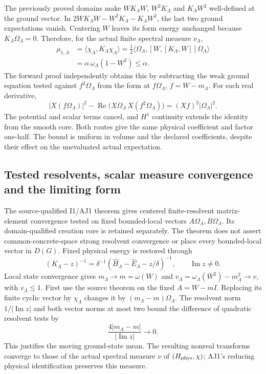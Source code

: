 The previously proved domains make $WK_\Lambda W$, $W^2K_\Lambda$ and $K_\Lambda W^2$ well-defined at the ground vector. In $2WK_\Lambda W-W^2K_\Lambda-K_\Lambda W^2$, the last two ground expectations vanish. Centering $W$ leaves its form energy unchanged because $K_\Lambda\Omega_\Lambda=0$. Therefore, for the actual finite spectral measure $\nu_\Lambda$,
\begin{align}
 \mu_{1,\Lambda}
 &=\langle\chi_\Lambda,K_\Lambda\chi_\Lambda\rangle
 =\frac12\langle\Omega_\Lambda,[W,[K_\Lambda,W]]\Omega_\Lambda\rangle\\
 &=\alpha\,\omega_\Lambda(1-W^2)\le\alpha.
 \label{r28:eq:ak2-finite-moment}
\end{align}
The forward proof independently obtains this by subtracting the weak ground equation tested against $f^2\Omega_\Lambda$ from the form at $f\Omega_\Lambda$, $f=W-m_\Lambda$. For each real derivative,
\begin{equation}
 |X(f\Omega_\Lambda)|^2-\operatorname{Re}
  \bigl(\overline{X\Omega_\Lambda}\,X(f^2\Omega_\Lambda)\bigr)
  =(Xf)^2|\Omega_\Lambda|^2.
\end{equation}
The potential and scalar terms cancel, and $H^1$ continuity extends the identity from the smooth core. Both routes give the same physical coefficient and factor one-half. The bound is uniform in volume and the declared coefficients, despite their effect on the unevaluated actual expectation.

\subsection{Tested resolvents, scalar measure convergence and the limiting form}
The source-qualified I1/AJ1 theorem gives centered finite-resolvent matrix-element convergence tested on fixed bounded-local vectors $A\Omega_\Lambda,B\Omega_\Lambda$. Its domain-qualified creation core is retained separately. The theorem does not assert common-concrete-space strong resolvent convergence or place every bounded-local vector in $D(G)$. Fixed physical energy is restored through
\begin{equation}
 (K_\Lambda-z)^{-1}=\delta^{-1}
  (\widehat H_\Lambda-\widehat E_\Lambda-z/\delta)^{-1},
 \qquad\operatorname{Im}z\ne0.
 \label{r28:eq:ak2-rescale}
\end{equation}
Local state convergence gives $m_\Lambda\to m=\omega(W)$ and $v_\Lambda=\omega_\Lambda(W^2)-m_\Lambda^2\to v$, with $v_\Lambda\le1$. First use the source theorem on the fixed $A=W-mI$. Replacing its finite cyclic vector by $\chi_\Lambda$ changes it by $(m_\Lambda-m)\Omega_\Lambda$. The resolvent norm $1/|\operatorname{Im}z|$ and both vector norms at most two bound the difference of quadratic resolvent tests by
\begin{equation}
 \frac{4|m_\Lambda-m|}{|\operatorname{Im}z|}\longrightarrow0.
 \label{r28:eq:ak2-moving-center}
\end{equation}
This justifies the moving ground-state mean. The resulting nonreal transforms converge to those of the actual spectral measure $\nu$ of $(H_{\rm phys},\chi)$; AJ1's reducing physical identification preserves this measure.

